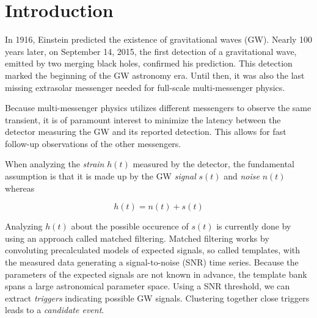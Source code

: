 

\section{Introduction}
In 1916, Einstein predicted the existence of gravitational waves (GW). Nearly
100 years later, on September 14, 2015, the first detection of a gravitational
wave\cite{PhysRevLett.116.061102}, emitted by two merging black holes, confirmed
his prediction. This detection marked the beginning of the GW astronomy era.
Until then, it was also the last missing extrasolar messenger needed for 
full-scale multi-messenger physics.
\cite{Branchesi_2016} 

Because multi-messenger physics utilizes different messengers to observe the 
same transient, it is of paramount interest to minimize the latency between 
the detector measuring the GW and its reported detection. This allows for
fast follow-up observations of the other messengers.

When analyzing the \textit{strain} $h(t)$ measured by the detector, the
fundamental assumption is that it is made up by the GW \textit{signal} $s(t)$
and \textit{noise} $n(t)$ whereas

\begin{equation}
  h(t) = n(t) + s(t)
\end{equation}

Analyzing $h(t)$ about the possible occurence of $s(t)$ is currently done by
using an approach called matched filtering. Matched filtering works by 
convoluting precalculated models of expected signals, so called templates, with
the measured data generating a signal-to-noise (SNR) time series. Because the
parameters of the expected signals are not known in advance, the template bank
spans a large astronomical parameter space.
Using a SNR threshold, we can extract \textit{triggers} indicating possible GW 
signals. Clustering together close triggers leads to a \textit{candidate event}.


